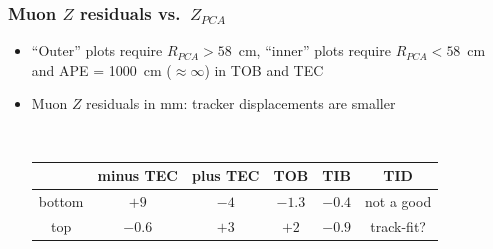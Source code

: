 \documentclass[compress]{beamer}
\begin{document}
\begin{frame}
\frametitle{Muon $Z$ residuals vs.\ $Z_{PCA}$}

\begin{itemize}

\item ``Outer'' plots require $R_{PCA} > 58$~cm, ``inner'' plots require $R_{PCA} < 58$~cm and APE = 1000~cm ($\approx \infty$) in TOB and TEC

\item Muon $Z$ residuals in mm: tracker displacements are smaller

\mbox{ } \hfill \scriptsize \begin{tabular}{c | c c c c c}
& minus TEC & plus TEC & TOB & TIB & TID \\\hline
bottom & $+9$ & $-4$ & $-1.3$ & $-0.4$ & not a good \\
top & $-0.6$ & $+3$ & $+2$ & $-0.9$ & track-fit? \\
\end{tabular} \hfill \mbox{ }
\end{itemize}


\end{frame}
\end{document}
